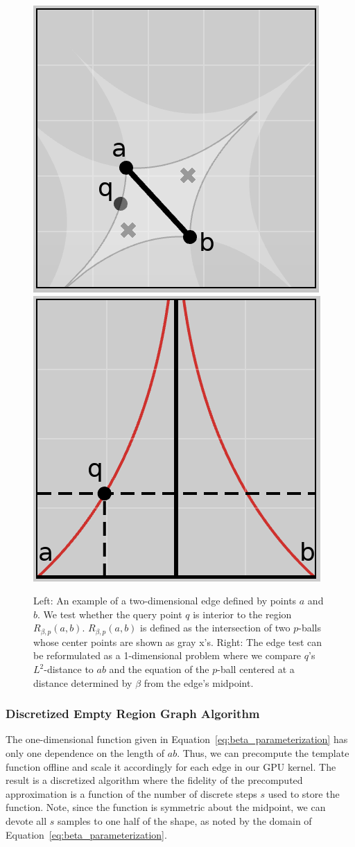 \begin{figure}[h]
    \includegraphics[width=0.48\linewidth]{figs/chap7/bskeleton.png}
    \includegraphics[width=0.48\linewidth]{figs/chap7/bskeletonParameter.png}
    \caption[Illustration of the one-dimensional edge test]{Left: An example of a two-dimensional edge defined by points $a$ and $b$.
    We test whether the query point $q$ is interior to the region $R_{\beta,p}(a,b)$.
    $R_{\beta,p}(a,b)$ is defined as the intersection of two $p$-balls whose center points are shown as gray x's.
    Right: The edge test can be reformulated as a 1-dimensional problem where we compare $q$'s $L^2$-distance to $ab$ and the equation of the $p$-ball centered at a distance determined by $\beta$ from the edge's midpoint.}
    \label{fig:beta_p_example}
\end{figure}

\subsubsection{Discretized Empty Region Graph Algorithm}
\label{sec:gpu_bp_discrete}

The one-dimensional function given in Equation~\ref{eq:beta_parameterization} has only one dependence on the length of $ab$.
%
Thus, we can precompute the template function offline and scale it accordingly for each edge in our GPU kernel.
%
The result is a discretized algorithm where the fidelity of the precomputed approximation is a function of the number of discrete steps $s$ used to store the function.
%
Note, since the function is symmetric about the midpoint, we can devote all $s$ samples to one half of the shape, as noted by the domain of Equation~\ref{eq:beta_parameterization}.

